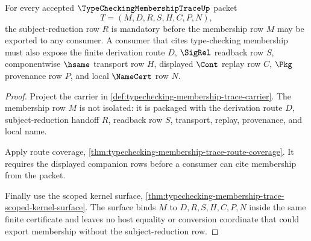 \begin{theorem}
\label{thm:typechecking-membership-trace-subject-reduction-consumer-lock}
For every accepted $\TypeCheckingMembershipTraceUp$ packet
$$
T=(M,D,R,S,H,C,P,N),
$$
the subject-reduction row $R$ is mandatory before the membership row $M$ may be exported to any consumer. A consumer that cites type-checking membership must also expose the finite derivation route $D$, $\SigRel$ readback row $S$, componentwise $\hsame$ transport row $H$, displayed $\Cont$ replay row $C$, $\Pkg$ provenance row $P$, and local $\NameCert$ row $N$.
\end{theorem}
\begin{proof}
Project the carrier in \autoref{def:typechecking-membership-trace-carrier}. The membership row $M$ is not isolated: it is packaged with the derivation route $D$, subject-reduction handoff $R$, readback row $S$, transport, replay, provenance, and local name.

Apply route coverage, \autoref{thm:typechecking-membership-trace-route-coverage}. It requires the displayed companion rows before a consumer can cite membership from the packet.

Finally use the scoped kernel surface, \autoref{thm:typechecking-membership-trace-scoped-kernel-surface}. The surface binds $M$ to $D,R,S,H,C,P,N$ inside the same finite certificate and leaves no host equality or conversion coordinate that could export membership without the subject-reduction row.
\end{proof}

